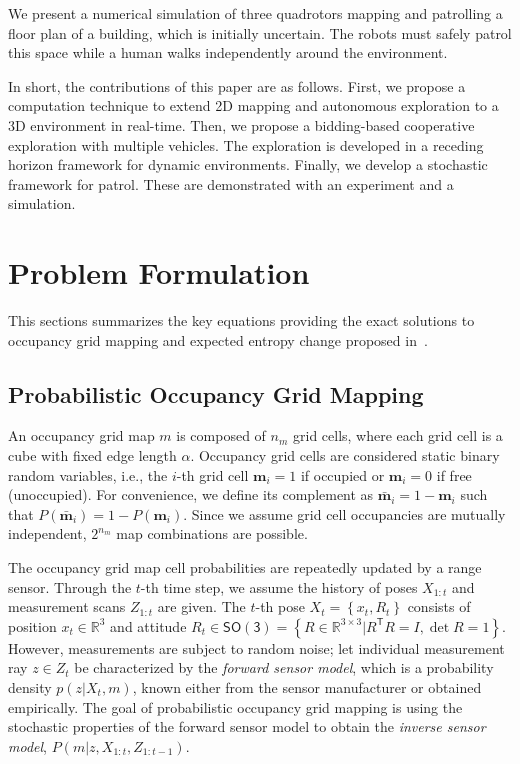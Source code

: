 \documentclass[smallextended]{svjour3}       %
\newcommand{\braces}[1]{\ensuremath{\left\{ #1 \right\}}}
\newcommand{\SO}{\ensuremath{\mathsf{SO(3)}}}
\newcommand{\T}{\ensuremath{\mathsf{T}}}
\renewcommand{\Re}{\ensuremath{\mathbb{R}}}
\begin{document}
We present a numerical simulation of three quadrotors mapping and patrolling a floor plan of a building, which is initially uncertain. The robots must safely patrol this space while a human walks independently around the environment.

In short, the contributions of this paper are as follows. First, we propose a computation technique to extend 2D mapping and autonomous exploration to a 3D environment in real-time. Then, we propose a bidding-based cooperative exploration with multiple vehicles. The exploration is developed in a receding horizon framework for dynamic environments. Finally, we develop a stochastic framework for patrol. These are demonstrated with an experiment and a simulation.


\section{Problem Formulation}
\label{sec:ProbDef}

This sections summarizes the key equations providing the exact solutions to occupancy grid mapping and expected entropy change proposed in~\cite{KauLeeAiMos16,KauTakAiLee17,KauTakAiLee18,KauAiLee16}.

\subsection{Probabilistic Occupancy Grid Mapping}
\label{subsec:POGM}
An occupancy grid map $m$ is composed of $n_m$ grid cells, where each grid cell is a cube with fixed edge length $\alpha$. Occupancy grid cells are considered static binary random variables, i.e., the $i$-th grid cell $\mathbf{m}_i=1$ if occupied or $\mathbf{m}_i=0$ if free (unoccupied). For convenience, we define its complement as $\bar{\mathbf{m}}_i=1-\mathbf{m}_i$ such that $P(\bar{\mathbf{m}}_i)=1-P(\mathbf{m}_i)$. Since we assume grid cell occupancies are mutually independent, $2^{n_m}$ map combinations are possible.

The occupancy grid map cell probabilities are repeatedly updated by a range sensor. Through the $t$-th time step, we assume the history of poses $X_{1:t}$ and measurement scans $Z_{1:t}$ are given. The $t$-th pose $X_t=\braces{x_t,R_t}$ consists of position $x_t\in\Re^3$ and attitude $R_t\in\SO=\braces{R\in\Re^{3\times3}|R^\T R=I,\det{R}=1}$. However, measurements are subject to random noise; let individual measurement ray $z\in Z_t$ be characterized by the \emph{forward sensor model}, which is a probability density $p(z|X_t,m)$, known either from the sensor manufacturer or obtained empirically. The goal of probabilistic occupancy grid mapping is using the stochastic properties of the forward sensor model to obtain the \emph{inverse sensor model}, $P(m|z,X_{1:t},Z_{1:t-1})$.
\end{document}
